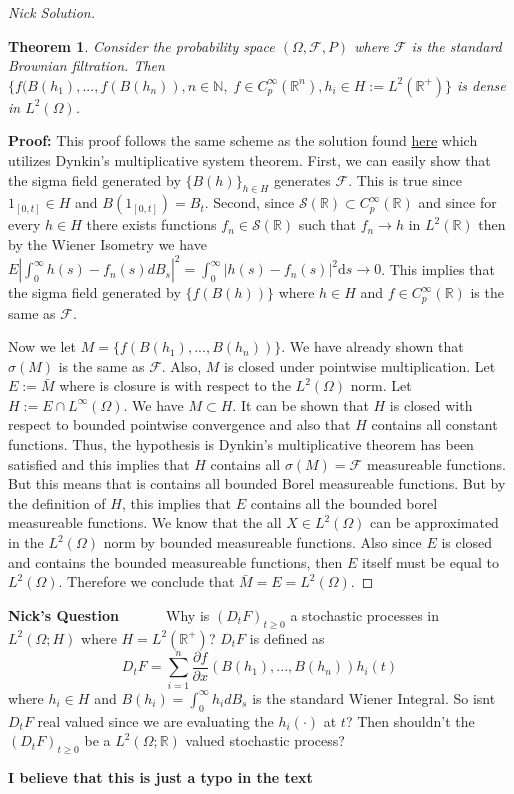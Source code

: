 \documentclass[a4paper,11pt]{article}
\numberwithin{equation}{section}
\theoremstyle{plain}
\newtheorem{theorem}{Theorem}[section]
\theoremstyle{definition}
\newcommand{\ud}{\ensuremath{\mathrm{d}}}
\newcommand{\R}{\mathbb{R}}
\newcounter{NQ}
\newenvironment{NickQuestion}[1][] %
{\refstepcounter{NQ}
	\begin{mdframed}[backgroundcolor=lightgray]\textbf{Nick's Question \theNQ \: #1~~}~~~\noindent}%
	{\end{mdframed}}
\numberwithin{NQ}{section}
\numberwithin{LQ}{section}
\numberwithin{ZQ}{section}
\begin{document}
\begin{proof}[Nick Solution]
	\begin{theorem} \label{density}
		Consider the probability space $(\Omega, \mathcal F, P)$ where $\mathcal F$ is the standard Brownian filtration. Then $\{f(B(h_1),...,f(B(h_n)), n\in \mathbb N,\; f\in C^\infty_p(\R^n), h_i \in H:=L^2(\R^+)   \}$ is dense in $L^2(\Omega)$.
	\end{theorem}
\textbf{Proof:} This proof follows the same scheme as the solution found \href{https://math.stackexchange.com/questions/750049/density-of-cylindrical-random-variables-in-classical-wiener-space}{here} which utilizes Dynkin's multiplicative system theorem. First, we can easily show that the sigma field generated by $\{B(h)\}_{h \in H}$ generates $\mathcal F$. This is true since $1_{[0,t]} \in H$ and $B(1_{[0,t]})=B_t$. Second, since $\mathscr S (\R) \subset C^\infty_p(\R)$ and since for every $h \in H$ there exists functions $f_n \in \mathscr S(\R)$ such that $f_n \to h$ in $L^2(\R)$ then by the Wiener Isometry we have $E|\int_0^\infty h(s)-f_n(s) dB_s|^2 = \int_0^\infty|h(s)-f_n(s)|^2 \ud s \to 0$. This implies that the sigma field generated by $\{f(B(h))\}$ where $h \in H$ and $f \in C^\infty_p(\R)$ is the same as $\mathcal F$.

Now we let $M=\{f(B(h_1),...,B(h_n))\}$. We have already shown that $\sigma (M)$ is the same as $\mathcal F$. Also, $M$ is closed under pointwise multiplication. Let $E:= \bar{M}$ where is closure is with respect to the $L^2(\Omega)$ norm. Let $H:=E \cap L^\infty(\Omega)$. We have $M \subset H$. It can be shown that $H$ is closed with respect to bounded pointwise convergence and also that $H$ contains all constant functions. Thus, the hypothesis is Dynkin's multiplicative theorem has been satisfied and this implies that $H$ contains all $\sigma (M) = \mathcal F$ measureable functions. But this means that is contains all bounded Borel measureable functions. But by the definition of $H$, this implies that $E$ contains all the bounded borel measureable functions. We know that the all $X\in L^2(\Omega)$ can be approximated in the $L^2(\Omega)$ norm by bounded measureable functions. Also since $E$ is closed and contains the bounded measureable functions, then $E$ itself must be equal to $L^2(\Omega)$. Therefore we conclude that $\bar{M} =E = L^2(\Omega)$.

\end{proof}

\begin{NickQuestion}
	Why is $(D_tF)_{t \ge 0}$ a stochastic processes in $L^2(\Omega ; H)$ where $H=L^2(\mathbb R^+)$? $D_tF$ is defined as
	\[
	D_tF = \sum_{i=1}^n \frac{\partial f}{\partial x}(B(h_1),...,B(h_n))h_i(t)
	\]
	where $h_i \in H$ and $B(h_i) = \int_0^\infty h_i dB_s$ is the standard Wiener Integral. So isnt $D_tF$ real valued since we are evaluating the $h_i(\cdot)$ at $t$? Then shouldn't the $(D_tF)_{t \ge 0}$ be a $L^2(\Omega; \mathbb R)$ valued stochastic process?
	\end{NickQuestion}
\textbf{I believe that this is just a typo in the text}
\end{document}
